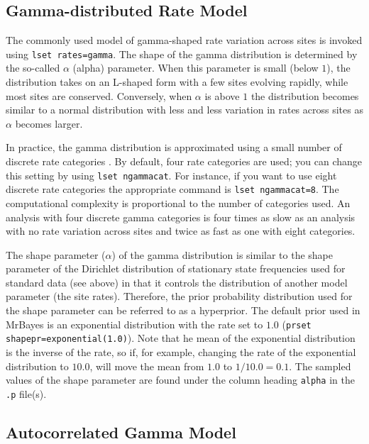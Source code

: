 \documentclass[12pt]{book}
\begin{document}
\subsection{Gamma-distributed Rate Model}
\label{gammaDistributedRateModel}

The commonly used model of gamma-shaped rate variation across sites is invoked using \texttt{lset
rates=gamma}. The shape of the gamma distribution is determined by the so-called $\alpha$ (alpha)
parameter. When this parameter is small (below $1$), the distribution takes on an L-shaped form
with a few sites evolving rapidly, while most sites are conserved. Conversely, when $\alpha$ is
above $1$ the distribution becomes similar to a normal distribution with less and less variation in
rates across sites as $\alpha$ becomes larger.

In practice, the gamma distribution is approximated using a small number of discrete rate
categories \citep{yang94a}. By default, four rate categories are used; you can change this setting
by using \texttt{lset ngammacat}. For instance, if you want to use eight discrete rate categories
the appropriate command is \texttt{lset ngammacat=8}. The computational complexity is proportional
to the number of categories used. An analysis with four discrete gamma categories is four times as
slow as an analysis with no rate variation across sites and twice as fast as one with eight
categories.

The shape parameter ($\alpha$) of the gamma distribution is similar to the shape parameter of the
Dirichlet distribution of stationary state frequencies used for standard data (see above) in that
it controls the distribution of another model parameter (the site rates). Therefore, the prior
probability distribution used for the shape parameter can be referred to as a hyperprior. The
default prior used in MrBayes is an exponential distribution with the rate set to $1.0$
(\texttt{prset shapepr=exponential(1.0)}). Note that he mean of the exponential distribution is the
inverse of the rate, so if, for example, changing the rate of the exponential distribution to
$10.0$, will move the mean from $1.0$ to $1/10.0 = 0.1$. The sampled values of the shape parameter
are found under the column heading \texttt{alpha} in the \texttt{.p} file(s).

\subsection{Autocorrelated Gamma Model}
\end{document}
